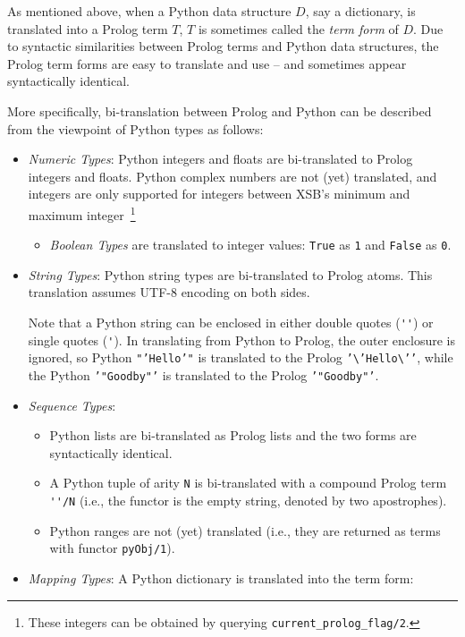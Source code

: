 As mentioned above, when a Python data structure $D$, say a
dictionary, is translated into a Prolog term $T$, $T$ is sometimes
called the {\em term form} of $D$.  Due to syntactic similarities
between Prolog terms and Python data structures, the Prolog term forms
are easy to translate and use -- and sometimes appear syntactically
identical.

More specifically, bi-translation between Prolog and Python can be
described from the viewpoint of Python types as follows: 

\begin{itemize}
       \item {\em Numeric Types}: Python integers and floats are
         bi-translated to Prolog integers and floats.  Python complex
         numbers are not (yet) translated, and integers are only
         supported for integers between XSB's minimum and maximum
         integer~\footnote{These integers can be obtained by querying
           {\tt current\_prolog\_flag/2}.}
         \begin{itemize}
           \item {\em Boolean Types} are
             translated to integer values: {\tt True} as {\tt 1}
             and {\tt False} as {\tt 0}.
         \end{itemize}
       \item {\em String Types}: Python string types are bi-translated
         to Prolog atoms.  This translation assumes UTF-8 encoding on
         both sides.

         Note that a Python string can be enclosed in either double
         quotes (\verb|''|) or single quotes (\verb|'|).  In
         translating from Python to Prolog, the outer enclosure is
         ignored, so Python {\tt "'Hello'"} is translated to the
         Prolog {\tt '\textbackslash{}'Hello\textbackslash{}'{}'},
         while the Python {\tt '"Goodby"'} is translated to the Prolog
         {\tt '"Goodby"'}.
       \item {\em Sequence Types}:
         \begin{itemize}
           \item Python lists are bi-translated as Prolog lists and
             the two forms are syntactically identical.
           \item A Python tuple of arity {\tt N} is bi-translated with
             a compound Prolog term \verb|''/N| (i.e., the functor is
             the empty string, denoted by two apostrophes).
             \item Python ranges are not (yet) translated (i.e., they
               are returned as terms with functor {\tt pyObj/1}).
         \end{itemize}
       \item {\em Mapping Types}: A Python dictionary is translated
         into the term form:


\end{itemize}
